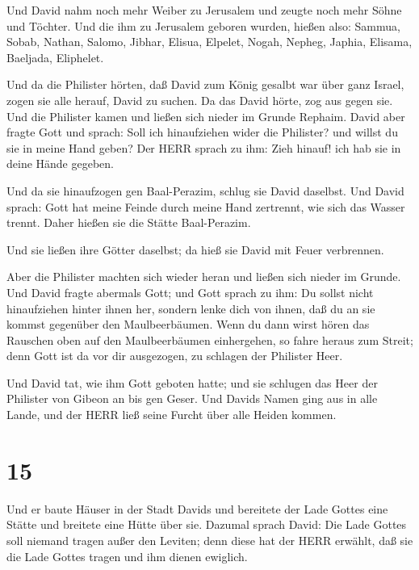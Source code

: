  Und David nahm noch mehr Weiber zu Jerusalem und zeugte
noch mehr Söhne und Töchter.  Und die ihm zu Jerusalem
geboren wurden, hießen also: Sammua, Sobab, Nathan, Salomo, 
Jibhar, Elisua, Elpelet,  Nogah, Nepheg, Japhia,
 Elisama, Baeljada, Eliphelet.

 Und da die Philister hörten, daß David zum König gesalbt
war über ganz Israel, zogen sie alle herauf, David zu suchen. Da das
David hörte, zog aus gegen sie.  Und die Philister kamen und
ließen sich nieder im Grunde Rephaim.  David aber fragte
Gott und sprach: Soll ich hinaufziehen wider die Philister? und willst
du sie in meine Hand geben? Der HERR sprach zu ihm: Zieh hinauf! ich hab
sie in deine Hände gegeben.

 Und da sie hinaufzogen gen Baal-Perazim, schlug sie David
daselbst. Und David sprach: Gott hat meine Feinde durch meine Hand
zertrennt, wie sich das Wasser trennt. Daher hießen sie die Stätte
Baal-Perazim.

 Und sie ließen ihre Götter daselbst; da hieß sie David mit
Feuer verbrennen.

 Aber die Philister machten sich wieder heran und ließen
sich nieder im Grunde.  Und David fragte abermals Gott; und
Gott sprach zu ihm: Du sollst nicht hinaufziehen hinter ihnen her,
sondern lenke dich von ihnen, daß du an sie kommst gegenüber den
Maulbeerbäumen.  Wenn du dann wirst hören das Rauschen oben
auf den Maulbeerbäumen einhergehen, so fahre heraus zum Streit; denn
Gott ist da vor dir ausgezogen, zu schlagen der Philister Heer.

 Und David tat, wie ihm Gott geboten hatte; und sie
schlugen das Heer der Philister von Gibeon an bis gen Geser.
 Und Davids Namen ging aus in alle Lande, und der HERR ließ
seine Furcht über alle Heiden kommen.

\hypertarget{section-14}{%
\section{15}\label{section-14}}

 Und er baute Häuser in der Stadt Davids und bereitete der
Lade Gottes eine Stätte und breitete eine Hütte über sie. 
Dazumal sprach David: Die Lade Gottes soll niemand tragen außer den
Leviten; denn diese hat der HERR erwählt, daß sie die Lade Gottes tragen
und ihm dienen ewiglich.

